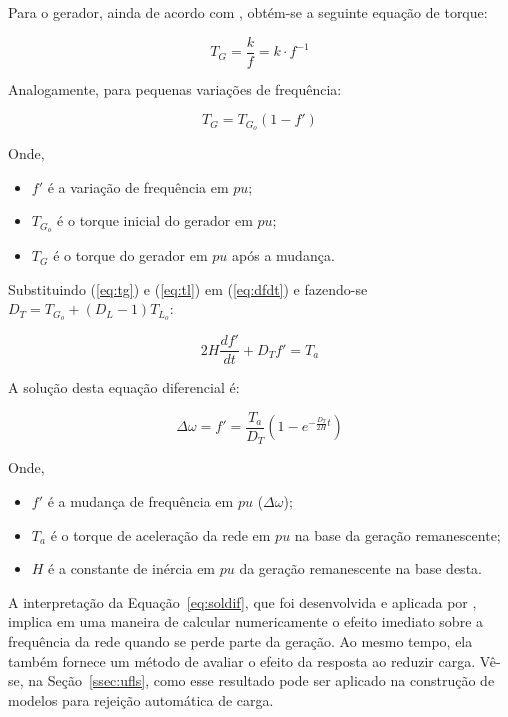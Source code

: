 Para o gerador, ainda de acordo com \citeauthor{get6449}, obt{\'e}m-se a seguinte equa{\c c}{\~a}o de torque:

\begin{equation}
	\label{eq:tgen}
	T_{G} = \frac{k}{f} = k \cdot f^{-1}
\end{equation}

Analogamente, para pequenas varia{\c c}{\~o}es de frequ{\^e}ncia:

\begin{equation}
	\label{eq:tg}
	T_{G} = T_{G_{o}} \left(1-f'\right)
\end{equation}

Onde,

\begin{itemize}
	\item[] $f'$ {\'e} a varia{\c c}{\~a}o de frequ{\^e}ncia em $pu$;
	\item[] $T_{G_{o}}$ {\'e} o torque inicial do gerador em $pu$;
	\item[] $T_{G}$ {\'e} o torque do gerador em $pu$ ap{\'o}s a mudan{\c c}a.
\end{itemize}

Substituindo (\ref{eq:tg}) e (\ref{eq:tl}) em (\ref{eq:dfdt}) e fazendo-se $D_{T} = T_{G_{o}} + \left(D_{L}-1\right)T_{L_{o}}$:

\begin{equation}
	\label{eq:difeq}
	2H\frac{df'}{dt} + D_{T}f' = T_{a}
\end{equation}

A solu{\c c}{\~a}o desta equa{\c c}{\~a}o diferencial {\'e}:

\begin{equation}
	\label{eq:soldif}
	\Delta \omega = f' = \frac{T_{a}}{D_{T}} \left(1 - e^{-\frac{D_{T}}{2H}t}\right)
\end{equation}

Onde,

\begin{itemize}
	\item[] $f'$ {\'e} a mudan{\c c}a de frequ{\^e}ncia em $pu$ ($\Delta \omega$);
	\item[] $T_{a}$ {\'e} o torque de acelera{\c c}{\~a}o da rede em $pu$ na base da gera{\c c}{\~a}o remanescente;
	\item[] $H$ {\'e} a constante de in{\'e}rcia em $pu$ da gera{\c c}{\~a}o remanescente na base desta.
\end{itemize}

A interpreta{\c c}{\~a}o da Equa{\c c}{\~a}o~\ref{eq:soldif}, que foi desenvolvida e aplicada por \citeauthor{get6449}, implica em uma maneira de calcular numericamente o efeito imediato sobre a frequ{\^e}ncia da rede quando se perde parte da gera{\c c}{\~a}o. Ao mesmo tempo, ela tamb{\'e}m fornece um m{\'e}todo de avaliar o efeito da resposta ao reduzir carga. V{\^e}-se, na Se{\c c}{\~a}o~\ref{ssec:ufls}, como esse resultado pode ser aplicado na constru{\c c}{\~a}o de modelos para rejei{\c c}{\~a}o autom{\'a}tica de carga.

